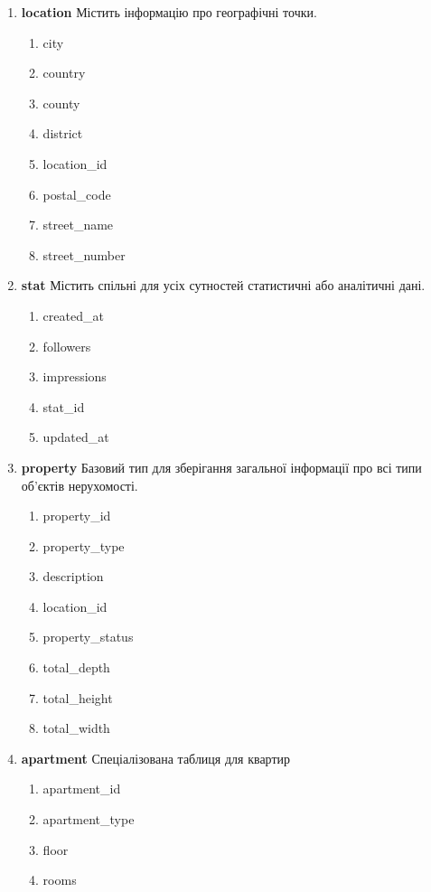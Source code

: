 \begin{enumerate}
    \item \textbf{location}
          Містить інформацію про географічні точки.
          \begin{enumerate}
              \item city
              \item country
              \item county
              \item district
              \item location\_id
              \item postal\_code
              \item street\_name
              \item street\_number
          \end{enumerate}

    \item \textbf{stat}
          Містить спільні для усіх сутностей статистичні або аналітичні дані.
          \begin{enumerate}
              \item created\_at
              \item followers
              \item impressions
              \item stat\_id
              \item updated\_at
          \end{enumerate}

    \item \textbf{property}
          Базовий тип для зберігання загальної інформації про всі типи об'єктів нерухомості.
          \begin{enumerate}
              \item property\_id
              \item property\_type
              \item description
              \item location\_id
              \item property\_status
              \item total\_depth
              \item total\_height
              \item total\_width
          \end{enumerate}

    \item \textbf{apartment}
          Спеціалізована таблиця для квартир
          \begin{enumerate}
              \item apartment\_id
              \item apartment\_type
              \item floor
              \item rooms
          \end{enumerate}


\end{enumerate}
